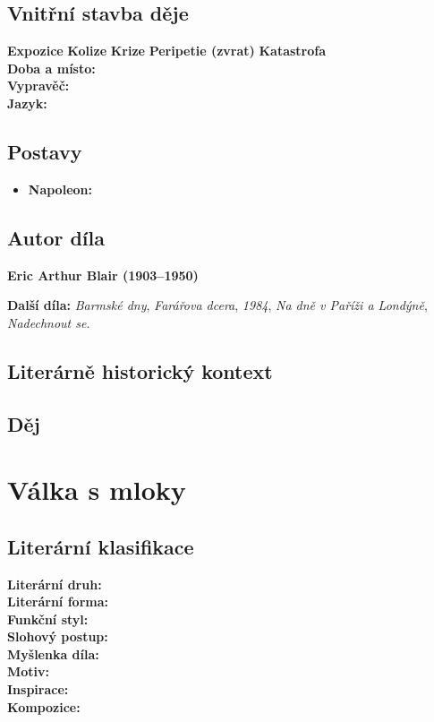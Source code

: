 \documentclass[12pt, a4paper]{article}
\newcommand{\mybf}[1]{\textcolor[RGB]{0, 179, 219}{\textbf{#1}}}
\begin{document}
\subsection*{Vnitřní stavba děje}
\noindent\textbf{Expozice} 
\noindent\textbf{Kolize} 
\noindent\textbf{Krize} 
\noindent\textbf{Peripetie (zvrat)} 
\noindent\textbf{Katastrofa} \\[10pt]
\mybf{Doba a místo:} \\[10pt]
\mybf{Vypravěč:} \\[10pt]
\mybf{Jazyk:} 

\subsection*{Postavy}
\begin{itemize}[itemsep=0.3em]
	\item \textbf{Napoleon:}
\end{itemize}

\subsection*{Autor díla}
\textbf{Eric Arthur Blair (1903--1950)}

\textbf{Další díla:} \textit{Barmské dny}, \textit{Farářova dcera}, \textit{1984}, \textit{Na dně v Paříži a Londýně}, \textit{Nadechnout se}.

\subsection*{Literárně historický kontext}

{\color{subsectioncolor}\hrulefill}
\subsection*{\color{subsectioncolor}Děj}

\newpage

\section{Válka s mloky}

\subsection*{Literární klasifikace}
\mybf{Literární druh:} \\[3pt]
\mybf{Literární forma:} \\[3pt]
\mybf{Funkční styl:} \\[3pt]
\mybf{Slohový postup:} \\[10pt]
\mybf{Myšlenka díla:} \\[10pt]
\mybf{Motiv:} \\[10pt]
\mybf{Inspirace:} \\[10pt]
\mybf{Kompozice:} 
\end{document}
